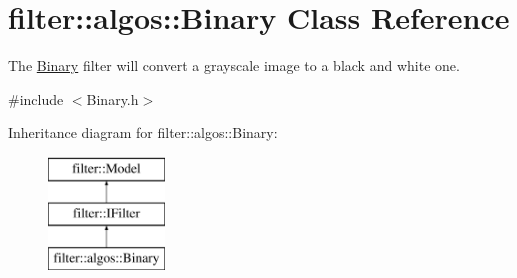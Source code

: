 \hypertarget{classfilter_1_1algos_1_1_binary}{}\section{filter\+:\+:algos\+:\+:Binary Class Reference}
\label{classfilter_1_1algos_1_1_binary}


The \hyperlink{classfilter_1_1algos_1_1_binary}{Binary} filter will convert a grayscale image to a black and white one.  




{\ttfamily \#include $<$Binary.\+h$>$}

Inheritance diagram for filter\+:\+:algos\+:\+:Binary\+:\begin{figure}[H]
\begin{center}
\leavevmode
\includegraphics[height=3.000000cm]{d9/dae/classfilter_1_1algos_1_1_binary}
\end{center}
\end{figure}
